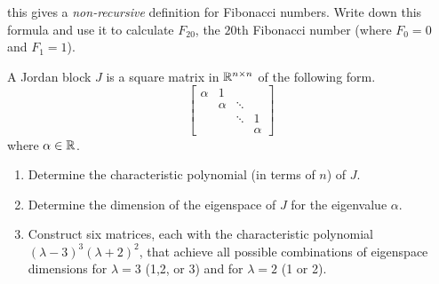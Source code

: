 \begin{tasks}[resume, style=enumerate]
\begin{enumerate}[label=(\alph*)]
    this gives a \textit{non-recursive} definition for Fibonacci
    numbers.  Write down this formula and use it to calculate
    $F_{20}$, the $20$th Fibonacci number (where $F_0 = 0$ and $F_1 =
    1$).
  \end{enumerate}
\task
  A Jordan block $J$ is a square matrix in $\mathbb R^{n \times n}$ of the
  following form.
  \begin{displaymath}
    \begin{bmatrix}
      \alpha & 1 & & \\
      & \alpha & \ddots & \\
      & & \ddots & 1 \\
      & & & \alpha
    \end{bmatrix}
  \end{displaymath}
  where $\alpha \in \mathbb R$.
  \begin{enumerate}[label=(\alph*)]
  \item
    Determine the characteristic polynomial (in terms of $n$) of $J$.
  \item
    Determine the dimension of the eigenspace of $J$ for the
    eigenvalue $\alpha$.
  \item
    Construct six matrices, each with the characteristic polynomial
    $(\lambda - 3)^3(\lambda + 2)^2$, that achieve all possible
    combinations of eigenspace dimensions for $\lambda = 3$ (1,2, or
    3) and for $\lambda = 2$ (1 or 2).
  \end{enumerate}
\end{tasks}
